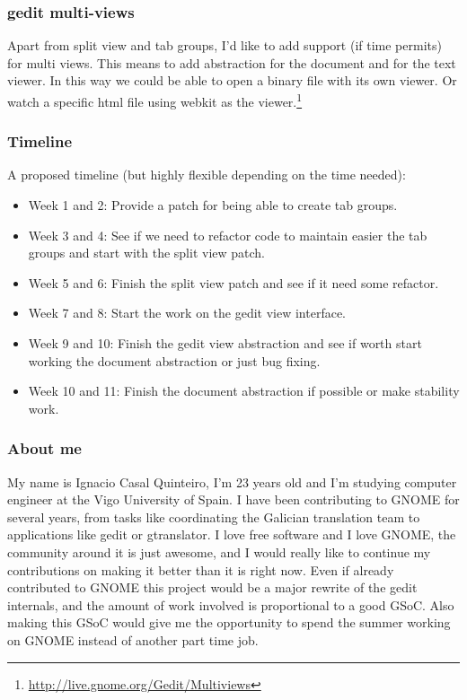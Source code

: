 \subsubsection{gedit multi-views}

Apart from split view and tab groups, I'd like to add support (if time permits) for multi views. This means to add abstraction for the document and for the text viewer. In this way we could be able to open a binary file with its own viewer. Or watch a specific html file using webkit as the viewer.\footnote{\url{http://live.gnome.org/Gedit/Multiviews}}

\subsubsection{Timeline}

A proposed timeline (but highly flexible depending on the time needed):

\begin{itemize}
  \item Week 1 and 2: Provide a patch for being able to create tab groups.
  \item Week 3 and 4: See if we need to refactor code to maintain easier the tab groups and start with the split view patch.
  \item Week 5 and 6: Finish the split view patch and see if it need some refactor.
  \item Week 7 and 8: Start the work on the gedit view interface.
  \item Week 9 and 10: Finish the gedit view abstraction and see if worth start working the document abstraction or just bug fixing.
  \item Week 10 and 11: Finish the document abstraction if possible or make stability work.
\end{itemize}

\subsubsection{About me}

My name is Ignacio Casal Quinteiro, I'm 23 years old and I'm studying computer engineer at the Vigo University of Spain. I have been contributing to GNOME for several years, from tasks like coordinating the Galician translation team to applications like gedit or gtranslator. I love free software and I love GNOME, the community around it is just awesome, and I would really like to continue my contributions on making it better than it is right now. Even if already contributed to GNOME this project would be a major rewrite of the gedit internals, and the amount of work involved is proportional to a good GSoC. Also making this GSoC would give me the opportunity to spend the summer working on GNOME instead of another part time job.

